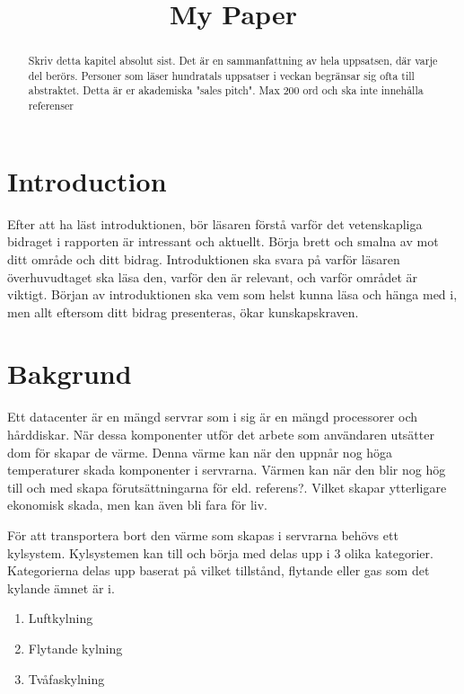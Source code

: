 \documentclass[conference,a4paper]{IEEEtran}
\begin{document}
\title{My Paper}
\author{
}
\maketitle
\begin{abstract}
Skriv detta kapitel absolut sist. Det är en sammanfattning av hela uppsatsen,
där varje del berörs. Personer som läser hundratals uppsatser i veckan begränsar
sig ofta till abstraktet. Detta är er akademiska "sales pitch". Max 200 ord och ska
inte innehålla referenser
\end{abstract}
\section{Introduction}
Efter att ha läst introduktionen, bör läsaren förstå varför det vetenskapliga
bidraget i rapporten är intressant och aktuellt. Börja brett och smalna av mot ditt
område och ditt bidrag. Introduktionen ska svara på varför läsaren överhuvudtaget
ska läsa den, varför den är relevant, och varför området är viktigt. Början av
introduktionen ska vem som helst kunna läsa och hänga med i, men allt eftersom ditt
bidrag presenteras, ökar kunskapskraven.
\section{Bakgrund}
Ett datacenter är en mängd servrar som i sig är en mängd processorer och hårddiskar. 
När dessa komponenter utför det arbete som användaren utsätter dom för skapar de värme. Denna värme kan när 
den uppnår nog höga temperaturer skada komponenter i servrarna. Värmen kan när den blir nog hög till och med
skapa förutsättningarna för eld. referens?. Vilket skapar ytterligare ekonomisk skada, men kan även bli fara för liv. 

För att transportera bort den värme som skapas i servrarna behövs ett kylsystem. Kylsystemen kan till och börja med 
delas upp i 3 olika kategorier. Kategorierna delas upp baserat på vilket tillstånd, flytande eller gas som det kylande
ämnet är i. 

\begin{enumerate}
    \item Luftkylning
    \item Flytande kylning 
    \item Tvåfaskylning
\end{enumerate}
\end{document}
